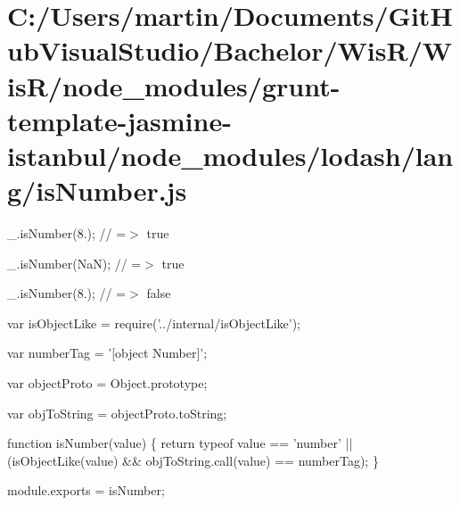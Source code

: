 \hypertarget{_c_1_2_users_2martin_2_documents_2_git_hub_visual_studio_2_bachelor_2_wis_r_2_wis_r_2node_modulee6c61a97fe4d621c4d4300870b3f639c}{}\section{C\+:/\+Users/martin/\+Documents/\+Git\+Hub\+Visual\+Studio/\+Bachelor/\+Wis\+R/\+Wis\+R/node\+\_\+modules/grunt-\/template-\/jasmine-\/istanbul/node\+\_\+modules/lodash/lang/is\+Number.\+js}
\+\_\+.\+is\+Number(8.); // =$>$ true

\+\_\+.\+is\+Number(\+Na\+N); // =$>$ true

\+\_\+.\+is\+Number(\textquotesingle{}8.\textquotesingle{}); // =$>$ false


\begin{DoxyCodeInclude}
var isObjectLike = require(\textcolor{stringliteral}{'../internal/isObjectLike'});

var numberTag = \textcolor{stringliteral}{'[object Number]'};

var objectProto = Object.prototype;

var objToString = objectProto.toString;

\textcolor{keyword}{function} isNumber(value) \{
  \textcolor{keywordflow}{return} typeof value == \textcolor{stringliteral}{'number'} || (isObjectLike(value) && objToString.call(value) == numberTag);
\}

module.exports = isNumber;
\end{DoxyCodeInclude}
 